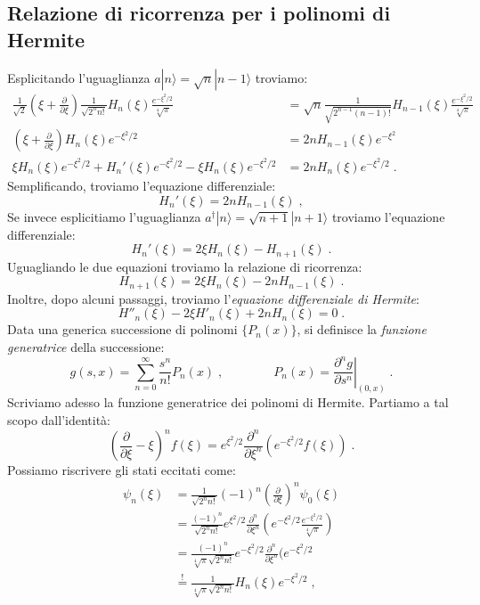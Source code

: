 \documentclass[12pt,a4paper]{report}
\theoremstyle{definition}
\newcommand{\pdev}[3][]{\frac{\partial^{#1} #2}{\partial #3^{#1}}}
\numberwithin{equation}{section}
\newcommand{\ket}{\rangle}
\newcommand{\adj}[1]{#1^{\dagger}}
\begin{document}
\subsection{Relazione di ricorrenza per i polinomi di Hermite}
Esplicitando l'uguaglianza $a|n\ket=\sqrt{n}|n-1\ket$ troviamo:
\begin{align*}
\frac{1}{\sqrt{2}}\left(\xi+\frac{\partial}{\partial\xi}\right)\frac{1}{\sqrt{2^n n!}}H_n(\xi)\frac{e^{-\xi^2/2}}{\sqrt[4]{\pi}}&=\sqrt{n}\frac{1}{\sqrt{2^{n-1}(n-1)!}}H_{n-1}(\xi)\frac{e^{-\xi^2/2}}{\sqrt[4]{\pi}} \\
\left(\xi+\frac{\partial}{\partial\xi}\right)H_n(\xi)e^{-\xi^2/2}&=2nH_{n-1}(\xi)e^{-\xi^2} \\
\xi H_n(\xi)e^{-\xi^2/2}+H_n'(\xi)e^{-\xi^2/2}-\xi H_n(\xi)e^{-\xi^2/2}&=2nH_n(\xi)e^{-\xi^2/2}\;.
\end{align*}
Semplificando, troviamo l'equazione differenziale:
\begin{equation}
H_n'(\xi)=2n H_{n-1}(\xi)\;,
\end{equation}
Se invece esplicitiamo l'uguaglianza $\adj{a}|n\ket=\sqrt{n+1}|n+1\ket$ troviamo l'equazione differenziale:
\begin{equation}
H_n'(\xi)=2\xi H_n(\xi)-H_{n+1}(\xi)\;.
\end{equation}
Uguagliando le due equazioni troviamo la relazione di ricorrenza:
\begin{equation}
H_{n+1}(\xi)=2\xi H_n(\xi)-2n H_{n-1}(\xi)\;.
\end{equation}
Inoltre, dopo alcuni passaggi, troviamo l'\textit{equazione differenziale di Hermite}:
\begin{equation}
H''_n(\xi)-2\xi H'_n(\xi)+2n H_n(\xi)=0\;.
\end{equation}
Data una generica successione di polinomi $\{P_n(x)\}$, si definisce la \textit{funzione generatrice} della successione:
\begin{equation}
g(s,x)=\sum_{n=0}^{\infty} \frac{s^n}{n!}P_n(x)\;,\qquad\qquad P_n(x)=\left.\pdev[n]{g}{s}\right|_{(0,x)}\;.
\end{equation}
Scriviamo adesso la funzione generatrice dei polinomi di Hermite. Partiamo a tal scopo dall'identità:
\begin{equation}
\left(\frac{\partial}{\partial\xi}-\xi\right)^nf(\xi)=e^{\xi^2/2}\frac{\partial^n}{\partial\xi^n}(e^{-\xi^2/2}f(\xi))\;.
\end{equation}
Possiamo riscrivere gli stati eccitati come:
\begin{align*}
\psi_n(\xi) &= \frac{1}{\sqrt{2^n n!}}(-1)^n\left(\frac{\partial}{\partial\xi}\right)^n\psi_0(\xi) \\
&= \frac{(-1)^n}{\sqrt{2^n n!}}e^{\xi^2/2}\frac{\partial^n}{\partial\xi^n}\left(e^{-\xi^2/2}\frac{e^{-\xi^2/2}}{\sqrt[4]{\pi}}\right) \\
&= \frac{(-1)^n}{\sqrt[4]{\pi}\sqrt{2^n n!}}e^{-\xi^2/2}\frac{\partial^n}{\partial\xi^n}(e^{-\xi^2/2} \\
&\stackrel{!}{=} \frac{1}{\sqrt[4]{\pi}\sqrt{2^n n!}}H_n(\xi)e^{-\xi^2/2}\;,
\end{align*}
\end{document}
